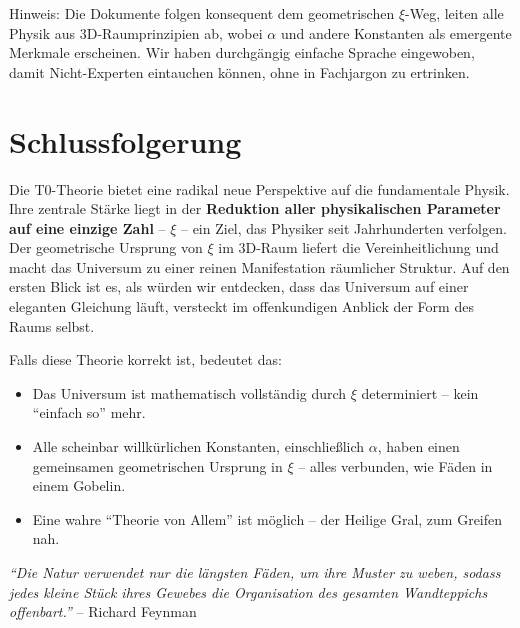 	Hinweis: Die Dokumente folgen konsequent dem geometrischen $\xi$-Weg, leiten alle Physik aus 3D-Raumprinzipien ab, wobei $\alpha$ und andere Konstanten als emergente Merkmale erscheinen. Wir haben durchgängig einfache Sprache eingewoben, damit Nicht-Experten eintauchen können, ohne in Fachjargon zu ertrinken.
	
	\section{Schlussfolgerung}
	
	Die T0-Theorie bietet eine radikal neue Perspektive auf die fundamentale Physik. Ihre zentrale Stärke liegt in der \textbf{Reduktion aller physikalischen Parameter auf eine einzige Zahl} – $\xi$ – ein Ziel, das Physiker seit Jahrhunderten verfolgen. Der geometrische Ursprung von $\xi$ im 3D-Raum liefert die Vereinheitlichung und macht das Universum zu einer reinen Manifestation räumlicher Struktur. Auf den ersten Blick ist es, als würden wir entdecken, dass das Universum auf einer eleganten Gleichung läuft, versteckt im offenkundigen Anblick der Form des Raums selbst.
	
	Falls diese Theorie korrekt ist, bedeutet das:
	\begin{itemize}
		\item Das Universum ist mathematisch vollständig durch $\xi$ determiniert – kein ``einfach so'' mehr.
		\item Alle scheinbar willkürlichen Konstanten, einschließlich $\alpha$, haben einen gemeinsamen geometrischen Ursprung in $\xi$ – alles verbunden, wie Fäden in einem Gobelin.
		\item Eine wahre ``Theorie von Allem'' ist möglich – der Heilige Gral, zum Greifen nah.
	\end{itemize}
	
	\vspace{1em}
	\begin{center}
		\textit{``Die Natur verwendet nur die längsten Fäden, um ihre Muster zu weben, sodass jedes kleine Stück ihres Gewebes die Organisation des gesamten Wandteppichs offenbart.''} -- Richard Feynman
	\end{center}
	